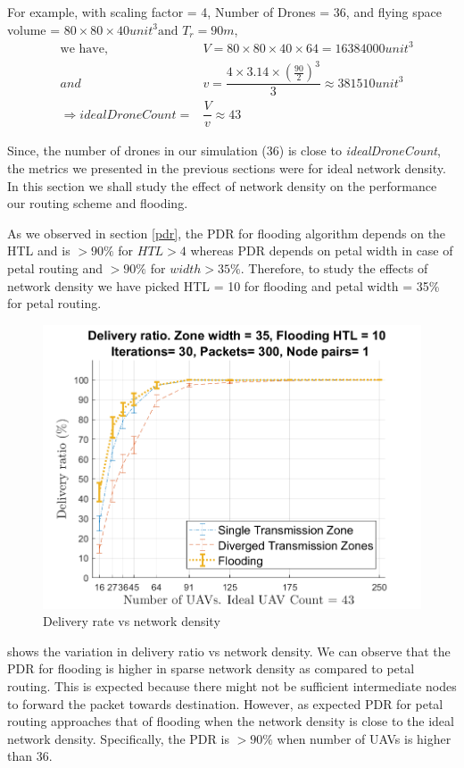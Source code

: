 For example, with scaling factor = 4, Number of Drones = 36, and flying space volume = $ 80 \times 80 \times 40 unit^3  \text{and } T_r = 90 m $,
\begin{eqnarray*}
& \text{we have,} & V = 80 \times 80 \times 40 \times 64 = 16384000 unit^3 \\
& {and} & v = \dfrac{4 \times 3.14 \times (\frac{90}{2}) ^ 3}{3} \approx 381510 unit ^ 3 \\
& \Rightarrow idealDroneCount = & \dfrac{V}{v} \approx 43
\end{eqnarray*}

Since, the number of drones in our simulation (36) is close to \emph{idealDroneCount}, the metrics we presented in the previous sections were for ideal network density. In this section we shall study the effect of network density on the performance our routing scheme and flooding.

As we observed in section \ref{pdr}, the PDR for flooding algorithm depends on the HTL and is $>90\%$ for $HTL>4$ whereas PDR depends on petal width in case of petal routing and $>90\%$ for $width>35\%$. 
Therefore, to study the effects of network density we have picked HTL = 10 for flooding and petal width = 35\% for petal routing. 

\begin{figure}[hbtp]
\centering
\includegraphics[width=1\textwidth]{ncsuthesis-0.6/Chapter-5/figs/ND_DR}
\caption{Delivery rate vs network density}
\label{fig:nd_DR}
\end{figure}

 shows the variation in delivery ratio vs network density. We can observe that the PDR for flooding is higher in sparse network density as compared to petal routing. This is expected because there might not be sufficient intermediate nodes to forward the packet towards destination. However, as expected PDR for petal routing approaches that of flooding when the network density is close to the ideal network density. Specifically, the PDR is $ > 90\%$ when number of UAVs is higher than 36.

